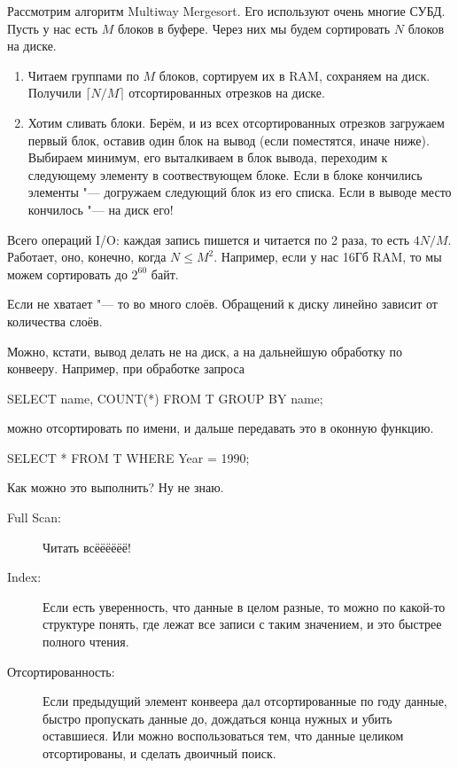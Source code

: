 Рассмотрим алгоритм Multiway Mergesort.
Его используют очень многие СУБД.
Пусть у нас есть $M$ блоков в буфере.
Через них мы будем сортировать $N$ блоков на диске.

\begin{enumerate}
\item
	Читаем группами по $M$ блоков, сортируем их в RAM, сохраняем на диск.
	Получили $\lceil N / M \rceil$ отсортированных отрезков на диске.

\item
	Хотим сливать блоки.
	Берём, и из всех отсортированных отрезков загружаем первый блок, оставив один блок на вывод (если поместятся, иначе ниже).
	Выбираем минимум, его выталкиваем в блок вывода, переходим к следующему элементу в соотвествующем блоке.
	Если в блоке кончились элементы "--- догружаем следующий блок из его списка.
	Если в выводе место кончилось "--- на диск его!
\end{enumerate}
Всего операций I/O: каждая запись пишется и читается по 2 раза, то есть $4N / M$.
Работает, оно, конечно, когда $N \le M^2$.
Например, если у нас 16Гб RAM, то мы можем сортировать до $2^60$ байт.

Если не хватает "--- то во много слоёв. Обращений к диску линейно зависит от количества слоёв.

Можно, кстати, вывод делать не на диск, а на дальнейшую обработку по конвееру.
Например, при обработке запроса
\begin{sqlcode}
SELECT name, COUNT(*)
	FROM T
	GROUP BY name;
\end{sqlcode}
можно отсортировать по имени, и дальше передавать это в оконную функцию.

\begin{sqlcode}
SELECT *
	FROM T
	WHERE Year = 1990;
\end{sqlcode}
Как можно это выполнить?
Ну не знаю.
\begin{description}
\item[Full Scan:]
	Читать всёёёёёё!

\item[Index:]
	Если есть уверенность, что данные в целом разные, то можно по какой-то структуре понять,
	где лежат все записи с таким значением, и это быстрее полного чтения.

\item[Отсортированность:]
	Если предыдущий элемент конвеера дал отсортированные по году данные,
	быстро пропускать данные до, дождаться конца нужных и убить оставшиеся.
	Или можно воспользоваться тем, что данные целиком отсортированы, и сделать двоичный поиск.
\end{description}

